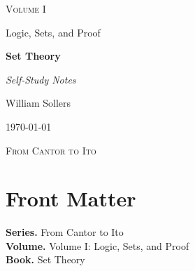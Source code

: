 \documentclass[12pt, a4paper]{report}
\begin{document}
\ExplSyntaxOff
\renewcommand{\familydefault}{\rmdefault}

\begin{titlepage}
\centering
\vspace*{3.5cm}

{\Large\scshape Volume I\par}
\vspace{0.35cm}
{\large Logic, Sets, and Proof\par}

\vspace{1.4cm}

{\Huge\bfseries Set Theory\par}

\vspace{0.6cm}
{\large\itshape Self-Study Notes\par}

\vfill

{\large William Sollers\par}
\vspace{0.35cm}
{\large \today\par}

\vfill

{\large\scshape From Cantor to Ito\par}
\end{titlepage}

\clearpage
\thispagestyle{plain}
\chapter*{Front Matter}
\noindent\textbf{Series.} From Cantor to Ito\\[0.5em]
\textbf{Volume.} Volume I: Logic, Sets, and Proof\\[0.5em]
\textbf{Book.} Set Theory

\clearpage
\tableofcontents
\clearpage
{}



\clearpage



\printindex[tech]
\printindex[dep]
\end{document}
